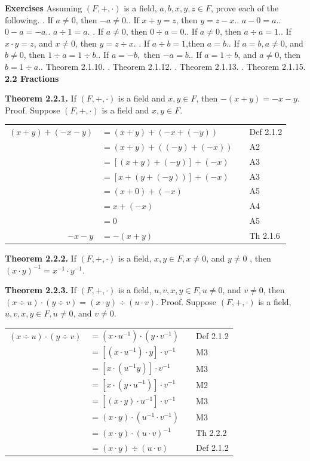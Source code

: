 \begin{large}
\textbf{Exercises} Assuming $(F,+,\cdot)$ is a field, $a,b,x,y,z \in F$, prove each of the following. . If $a \neq 0$, then $-a \neq 0$.. If $x + y = z$, then $y = z - x.$. $a -0 = a.$. $0 - a = -a.$. $a \div 1 = a.$ . If $a \neq 0$, then $0 \div a =0.$. If $a \neq 0$, then $a \div a = 1.$. If $x\cdot y = z$, and $x \neq 0$, then $y =z\div x.$ . If $a\div b = 1$,then $a = b.$. If $a = b, a \neq 0$, and $b \neq 0$, then $1\div a = 1 \div b.$. If $a = -b,$ then $-a = b.$. If $a = 1\div b$, and $a\neq 0$, then $b = 1\div a.$. Theorem 2.1.10. . Theorem 2.1.12. . Theorem 2.1.13. . Theorem 2.1.15. \nl
\newpage
\textbf{2.2 Fractions }\nl

\textbf{Theorem 2.2.1.} If $(F,+,\cdot)$ is a field and $x,y \in F$, then $-(x+y) = -x - y$.\nl
Proof. Suppose $(F,+,\cdot )$ is a field and $x,y\in F.$\nl
\begin{tabular}{r l l l}
$(x+y)+(-x-y)$& $=(x+y)+(-x+(-y))$ &&Def 2.1.2 \\
&$=(x+y)+((-y)+(-x))$ &&A2 \\
&$=[(x+y)+(-y)] +(-x)$ &&A3\\
&$=[x+(y+(-y))] +(-x)$ &&A3\\
&$=(x+0)+(-x)$&& A5\\
&$=x+(-x)$&& A4\\
&$=0$ && A5\\
$-x - y$& $=-(x+y)$&& Th 2.1.6 \\
\end{tabular}\nl

\textbf{Theorem 2.2.2.} If $(F,+,\cdot)$ is a field, $x,y \in F, x \neq  0$, and $y \neq 0$ , then
$(x\cdot y)^{-1} =x^{-1}\cdot y^{-1}.$\nl

\textbf{Theorem 2.2.3.} If $(F,+,\cdot)$ is a field, $u,v,x,y\in F, u \neq 0$, and $v \neq 0$, then $(x\div u)\cdot (y \div v) =(x\cdot y) \div  (u\cdot v).$\nl
Proof. Suppose $(F,+,\cdot)$ is a field, $u,v,x,y\in F, u \neq 0$, and $v \neq 0$.
\begin{tabular}{r l l l}
$(x\div u)\cdot(y\div v)$ & $=(x\cdot u^{-1})\cdot(y\cdot v^{-1})$ &&Def 2.1.2 \\
&$=[(x\cdot u^{-1})\cdot y]\cdot v^{-1}$ &&M3\\
&$=[x\cdot (u^{-1} y)]\cdot v^{-1}$ &&M3 \\
&$=[x\cdot (y\cdot u^{-1})]\cdot v^{-1}$ &&M2\\
&$=[(x\cdot y)\cdot u^{-1}]\cdot v^{-1}$ &&M3 \\
&$=(x\cdot y)\cdot (u^{-1}\cdot v^{-1})$ &&M3 \\
&$=(x\cdot y)\cdot (u\cdot v)^{-1}$ &&Th 2.2.2 \\
&$=(x\cdot y)\div (u\cdot v)$ &&Def 2.1.2 \\
\end{tabular}\nl


\end{large}
